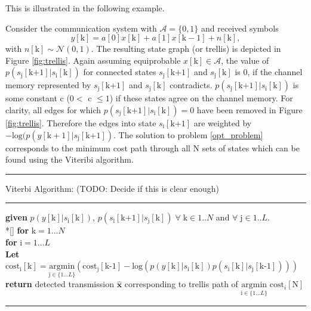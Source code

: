 \documentclass[12pt,a4paper]{report}
\begin{document}
This is illustrated in the following example. 
   \par
   Consider the communication system with $\mathcal{A}=\{0, 1\}$ and received symbols 
   \begin{equation*}
y[\text{k}] =  a[\text{0}]x[\text{k}] + a[\text{1}]x[\text{k}-1] + n[\text{k}],
\end{equation*}
with $n[\text{k}] \sim \mathcal{N}(0,1)$.
The resulting state graph (or trellis) is depicted in Figure \ref{fig:trellis}. 
Again assuming equiprobable 
$x[\text{k}] \in \mathcal{A}$, the value of $p(s_{\text{j}}[\text{k+1}]|s_{\text{i}}[\text{k}])$ for connected states $s_{\text{j}}[\text{k+1}]$ and $s_{\text{j}}[\text{k}]$ is  0, if the channel memory represented by $s_{\text{j}}[\text{k+1}]$ and $s_{\text{j}}[\text{k}]$ contradicts. $p(s_{\text{j}}[\text{k+1}]|s_{\text{i}}[\text{k}])$  is some constant c ($0<$ c $\leq1$) if these states agree on the channel memory. For clarity, all edges for which $p(s_{\text{j}}[\text{k+1}]|s_{\text{i}}[\text{k}])=0$ have been removed in Figure \ref{fig:trellis}. Therefore the edges into state $s_{\text{i}}[\text{k+1}]$ are weighted by
$-\text{log}(p(y[\text{k}+1]|s_{\text{j}}[\text{k+1}])$. The solution to problem \ref{opt_problem} corresponds to the minimum cost path through all N sets of states which can be found using the Viteribi algorithm. 
\\

    \noindent\rule[16pt]{\textwidth}{0.6pt}
	Viterbi Algorithm: (TODO: Decide if this is clear enough)

    \noindent\rule[10pt]{\textwidth}{0.4pt}
    {\footnotesize
    \begin{tabbing}
        {\bf given} $p(y[\text{k}]|s_{\text{i}}[\text{k}])$, $p(s_{\text{l}}[\text{k+1}]|s_{\text{j}}[\text{k}]) \; \forall  \; \text{k} \in {1..N}$ and $ \forall \; \text{j} \in {1..L}$. \\*[\smallskipamount]
        {\textbf{for}  $\text{k} = 1... N $} \\
         \qquad \= {\textbf{for} $\text{i} = 1... L$}\\
        \qquad \qquad \= \textbf{Let} $\text{cost}_{\text{i}}[\text{k}] = \underset{\text{j} \in \{1...L\}} {\text{argmin}}\left( \text{cost}_{\text{j}}[\text{k-1}]
        -\text{log}(p(y[\text{k}]|s_{\text{i}}[\text{k}])p(s_{\text{i}}[\text{k}]|s_{\text{j}}[\text{k-1}]))
        \right)$ \\
        {\bf return} detected transmission $\hat{\mathbf{x}}$ corresponding to trellis path of $\underset{\text{i} \in \{1...L\}} {\text{argmin}} \; \text{cost}_{i}[\text{N}] $
    \end{tabbing}}
    \noindent\rule[10pt]{\textwidth}{0.4pt}
\end{document}
